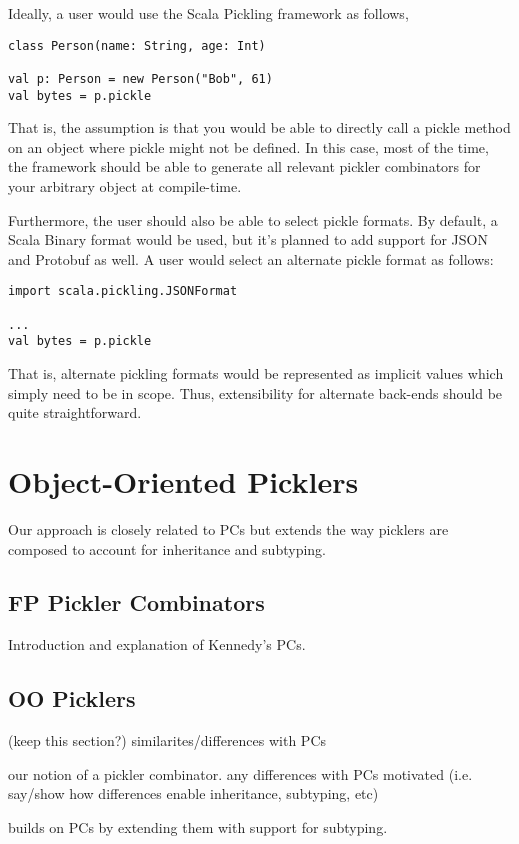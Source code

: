 \documentclass[preprint,10pt]{sigplanconf}
\begin{document}
Ideally, a user would use the Scala Pickling framework as follows,

\begin{verbatim}
class Person(name: String, age: Int)

val p: Person = new Person("Bob", 61)
val bytes = p.pickle
\end{verbatim}\noindent

That is, the assumption is that you would be able to directly call a
pickle method on an object where pickle might not be defined. In this
case, most of the time, the framework should be able to generate all
relevant pickler combinators for your arbitrary object at
compile-time.

Furthermore, the user should also be able to select pickle formats. By
default, a Scala Binary format would be used, but it's planned to add
support for JSON and Protobuf as well. A user would select an
alternate pickle format as follows:

\begin{verbatim}
import scala.pickling.JSONFormat

...
val bytes = p.pickle
\end{verbatim}\noindent

That is, alternate pickling formats would be represented as implicit
values which simply need to be in scope. Thus, extensibility for
alternate back-ends should be quite straightforward.

\section{Object-Oriented Picklers}
Our approach is closely related to PCs but extends the way picklers are composed to account for inheritance and subtyping.

\subsection{FP Pickler Combinators}
Introduction and explanation of Kennedy's PCs.

\subsection{OO Picklers}
(keep this section?) similarites/differences with PCs

our notion of a pickler combinator. any differences with PCs motivated (i.e. say/show how differences enable inheritance, subtyping, etc)

builds on PCs by extending them with support for subtyping.
\end{document}
